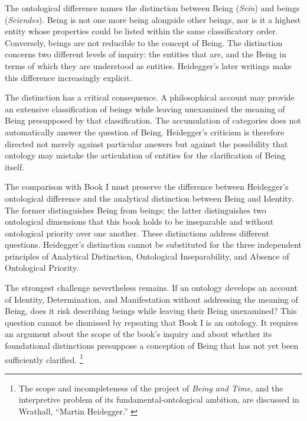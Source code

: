 \label{para:VS.B01.P01.C08.S11.SS03.P002}

The ontological difference names the distinction between
Being (\textit{Sein}) and beings (\textit{Seiendes}).
Being is not one more being alongside other beings, nor
is it a highest entity whose properties could be listed
within the same classificatory order. Conversely, beings
are not reducible to the concept of Being. The distinction
concerns two different levels of inquiry: the entities
that are, and the Being in terms of which they are
understood as entities. Heidegger's later writings
make this difference increasingly explicit.

\label{para:VS.B01.P01.C08.S11.SS03.P003}

The distinction has a critical consequence. A philosophical
account may provide an extensive classification of beings
while leaving unexamined the meaning of Being presupposed
by that classification. The accumulation of categories
does not automatically answer the question of Being.
Heidegger's criticism is therefore directed not merely
against particular answers but against the possibility
that ontology may mistake the articulation of entities
for the clarification of Being itself.
\cite[§§2--4]{HeideggerBeingTime}

\label{para:VS.B01.P01.C08.S11.SS03.P004}

The comparison with Book I must preserve the difference
between Heidegger's ontological difference and the
analytical distinction between Being and Identity.
The former distinguishes Being from beings; the latter
distinguishes two ontological dimensions that this book
holds to be inseparable and without ontological priority
over one another. These distinctions address different
questions. Heidegger's distinction cannot be substituted
for the three independent principles of Analytical
Distinction, Ontological Inseparability, and Absence
of Ontological Priority.

\label{para:VS.B01.P01.C08.S11.SS03.P005}

The strongest challenge nevertheless remains. If an
ontology develops an account of Identity, Determination,
and Manifestation without addressing the meaning of Being,
does it risk describing beings while leaving their Being
unexamined? This question cannot be dismissed by repeating
that Book I is an ontology. It requires an argument about
the scope of the book's inquiry and about whether its
foundational distinctions presuppose a conception of
Being that has not yet been sufficiently clarified.
\footnote{The scope and incompleteness of the project
of \textit{Being and Time}, and the interpretive problem
of its fundamental-ontological ambition, are discussed
in Wrathall, ``Martin Heidegger.'' \cite{WrathallHeideggerSEP2025}}


